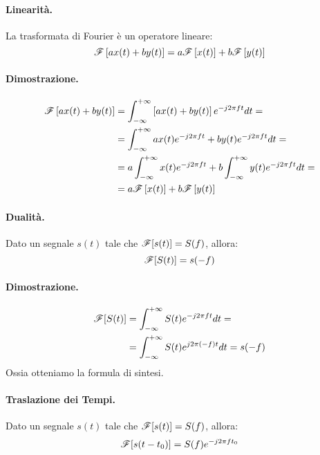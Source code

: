 \paragraph{Linearità.}
La trasformata di Fourier è un operatore lineare:
\begin{equation}
    {\mathscr{F}}\left[ax(t) + by(t)\right] = a{\mathscr{F}}\left[x(t)\right] + b{\mathscr{F}}\left[y(t)\right]
\end{equation}
\paragraph{Dimostrazione. }
\begin{align*}
    {\mathscr{F}}\left[ax(t) + by(t)\right] &= \int_{-\infty}^{+\infty} \left[ax(t) + by(t)\right] e^{-j2\pi ft}dt=\\
                                           &= \int_{-\infty}^{+\infty} ax(t)e^{-j2\pi ft} + by(t)e^{-j2\pi ft}dt= \\
                                           &= a\int_{-\infty}^{+\infty} x(t)e^{-j2\pi ft} + b\int_{-\infty}^{+\infty}y(t)e^{-j2\pi ft}dt=\\
                                           &= a{\mathscr{F}}\left[x(t)\right] + b{\mathscr{F}}\left[y(t)\right]
\end{align*}
\paragraph{Dualità.}
Dato un segnale $s(t)$ tale che ${\mathscr{F}}[s(t)] = S(f)$, allora:
\begin{equation}
    {\mathscr{F}}[S(t)] = s(-f)
\end{equation}
\paragraph{Dimostrazione.}
\begin{align*}
    {\mathscr{F}}[S(t)] &= \int_{-\infty}^{+\infty} S(t) e^{-j2\pi ft} dt =\\
                   &= \int_{-\infty}^{+\infty} S(t) e^{j2\pi (-f)t}dt = s(-f) 
\end{align*}
Ossia otteniamo la formula di sintesi.

\paragraph{Traslazione dei Tempi.}
Dato un segnale $s(t)$ tale che ${\mathscr{F}}[s(t)] = S(f)$, allora:
\begin{equation}\label{prop: traslTempi}
    {\mathscr{F}}[s(t - t_0)] = S(f)e^{-j2 \pi ft_0}
\end{equation}
